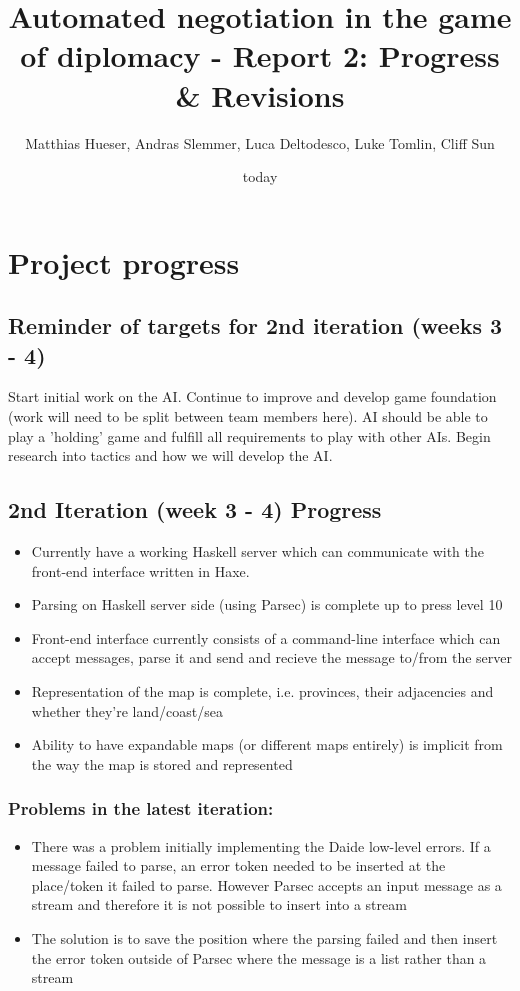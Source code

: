 \documentclass[12pt]{article}
\title{Automated negotiation in the game of diplomacy - Report 2: Progress \& Revisions}
\author{Matthias Hueser, Andras Slemmer, Luca Deltodesco, Luke Tomlin, Cliff Sun}
\date{today}
\begin{document}
\maketitle

\section{Project progress}

\subsection{Reminder of targets for 2nd iteration (weeks 3 - 4)}

Start initial work on the AI. Continue to improve and develop game
foundation (work will need to be split between team members here).
AI should be able to play a 'holding' game and fulfill all requirements
to play with other AIs. Begin research into tactics and how we will
develop the AI.

\subsection{2nd Iteration (week 3 - 4) Progress}
\begin{itemize}
\item Currently have a working Haskell server which can communicate with
the front-end interface written in Haxe. 
\item Parsing on Haskell server side (using Parsec) is complete up to press
level 10 
\item Front-end interface currently consists of a command-line interface
which can accept messages, parse it and send and recieve the message
to/from the server
\item Representation of the map is complete, i.e. provinces, their adjacencies
and whether they're land/coast/sea
\item Ability to have expandable maps (or different maps entirely) is implicit
from the way the map is stored and represented
\end{itemize}

\subsubsection{Problems in the latest iteration:}
\begin{itemize}
\item There was a problem initially implementing the Daide low-level errors.
If a message failed to parse, an error token needed to be inserted at
the place/token it failed to parse. However Parsec accepts an input message
as a stream and therefore it is not possible to insert into a stream
\item The solution is to save the position where the parsing failed and
then insert the error token outside of Parsec where the message is
a list rather than a stream
\end{itemize}
\end{document}
